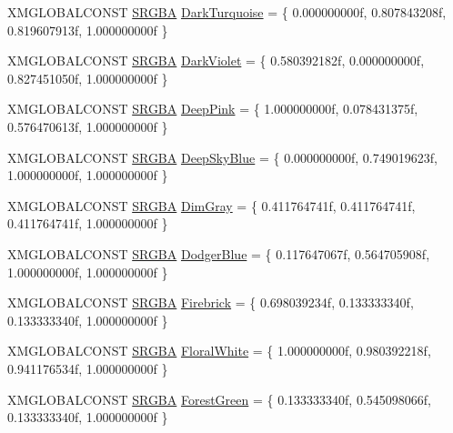 \begin{DoxyCompactItemize}
\item 
X\+M\+G\+L\+O\+B\+A\+L\+C\+O\+N\+ST \hyperlink{structmage_1_1_s_r_g_b_a}{S\+R\+G\+BA} \hyperlink{namespacemage_1_1color_a20b64f764acf8eaa468226d2b6d28fbc}{Dark\+Turquoise} = \{ 0.\+000000000f, 0.\+807843208f, 0.\+819607913f, 1.\+000000000f \}
\item 
X\+M\+G\+L\+O\+B\+A\+L\+C\+O\+N\+ST \hyperlink{structmage_1_1_s_r_g_b_a}{S\+R\+G\+BA} \hyperlink{namespacemage_1_1color_a667ce7c4545617295769b7f87570a307}{Dark\+Violet} = \{ 0.\+580392182f, 0.\+000000000f, 0.\+827451050f, 1.\+000000000f \}
\item 
X\+M\+G\+L\+O\+B\+A\+L\+C\+O\+N\+ST \hyperlink{structmage_1_1_s_r_g_b_a}{S\+R\+G\+BA} \hyperlink{namespacemage_1_1color_a7d979d0bc941056d06217ad624b7c7f3}{Deep\+Pink} = \{ 1.\+000000000f, 0.\+078431375f, 0.\+576470613f, 1.\+000000000f \}
\item 
X\+M\+G\+L\+O\+B\+A\+L\+C\+O\+N\+ST \hyperlink{structmage_1_1_s_r_g_b_a}{S\+R\+G\+BA} \hyperlink{namespacemage_1_1color_a0f5aa2a109509a69b498e00328605c3f}{Deep\+Sky\+Blue} = \{ 0.\+000000000f, 0.\+749019623f, 1.\+000000000f, 1.\+000000000f \}
\item 
X\+M\+G\+L\+O\+B\+A\+L\+C\+O\+N\+ST \hyperlink{structmage_1_1_s_r_g_b_a}{S\+R\+G\+BA} \hyperlink{namespacemage_1_1color_ace5b9fdda0cd1693bee0e7c392c3f052}{Dim\+Gray} = \{ 0.\+411764741f, 0.\+411764741f, 0.\+411764741f, 1.\+000000000f \}
\item 
X\+M\+G\+L\+O\+B\+A\+L\+C\+O\+N\+ST \hyperlink{structmage_1_1_s_r_g_b_a}{S\+R\+G\+BA} \hyperlink{namespacemage_1_1color_af164a12f2c4f24bfa492f5ad2acbcd27}{Dodger\+Blue} = \{ 0.\+117647067f, 0.\+564705908f, 1.\+000000000f, 1.\+000000000f \}
\item 
X\+M\+G\+L\+O\+B\+A\+L\+C\+O\+N\+ST \hyperlink{structmage_1_1_s_r_g_b_a}{S\+R\+G\+BA} \hyperlink{namespacemage_1_1color_a0f29ed4ce29d47fe494ce2b623933d1f}{Firebrick} = \{ 0.\+698039234f, 0.\+133333340f, 0.\+133333340f, 1.\+000000000f \}
\item 
X\+M\+G\+L\+O\+B\+A\+L\+C\+O\+N\+ST \hyperlink{structmage_1_1_s_r_g_b_a}{S\+R\+G\+BA} \hyperlink{namespacemage_1_1color_ac2c360600f107bfa162703196ccf66ac}{Floral\+White} = \{ 1.\+000000000f, 0.\+980392218f, 0.\+941176534f, 1.\+000000000f \}
\item 
X\+M\+G\+L\+O\+B\+A\+L\+C\+O\+N\+ST \hyperlink{structmage_1_1_s_r_g_b_a}{S\+R\+G\+BA} \hyperlink{namespacemage_1_1color_abb3995cf95a62e2f3407b9193d16fd8e}{Forest\+Green} = \{ 0.\+133333340f, 0.\+545098066f, 0.\+133333340f, 1.\+000000000f \}
\item 

\end{DoxyCompactItemize}
